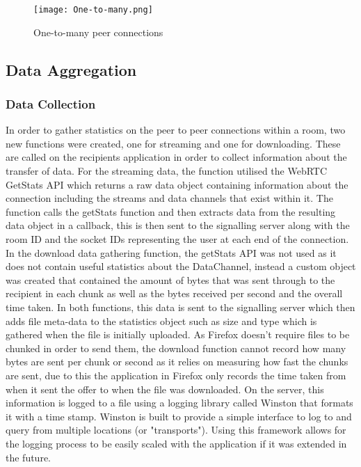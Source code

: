 \documentclass[]{report}
\begin{document}
			\begin{figure}[H]
				\caption{One-to-many peer connections}
				\centering
				\texttt{[image: One-to-many.png]}
			\end{figure}	
			
			\subsection{Data Aggregation}
				\subsubsection{Data Collection}
				In order to gather statistics on the peer to peer connections within a room, two new functions were created, one for streaming and one for downloading. These are called on the recipients application in order to collect information about the transfer of data. For the streaming data, the function utilised the WebRTC GetStats API which returns a raw data object containing information about the connection including the streams and data channels that exist within it. The function calls the getStats function and then extracts data from the resulting data object in a callback, this is then sent to the signalling server along with the room ID and the socket IDs representing the user at each end of the connection. In the download data gathering function, the getStats API was not used as it does not contain useful statistics about the DataChannel, instead a custom object was created that contained the amount of bytes that was sent through to the recipient in each chunk as well as the bytes received per second and the overall time taken. In both functions, this data is sent to the signalling server which then adds file meta-data to the statistics object such as size and type which is gathered when the file is initially uploaded. As Firefox doesn't require files to be chunked in order to send them, the download function cannot record how many bytes are sent per chunk or second as it relies on measuring how fast the chunks are sent, due to this the application in Firefox only records the time taken from when it sent the offer to when the file was downloaded. On the server, this information is logged to a file using a logging library called Winston that formats it with a time stamp. Winston is built to provide a simple interface to log to and query from multiple locations (or "transports"). Using this framework allows for the logging process to be easily scaled with the application if it was extended in the future.
				
\end{document}
